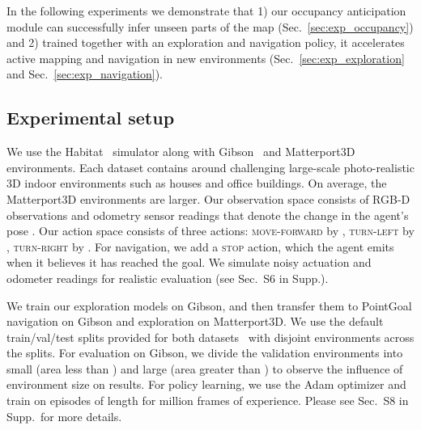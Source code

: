 \documentclass[runningheads]{llncs}
\begin{document}
In the following experiments we demonstrate that 1) our occupancy anticipation module can successfully infer unseen parts of the map (Sec.~\ref{sec:exp_occupancy}) and 2) trained together with an exploration and navigation policy, it accelerates active mapping and navigation in new environments (Sec.~\ref{sec:exp_exploration} and Sec.~\ref{sec:exp_navigation}).

\subsection{Experimental setup}
\label{sec:exp_setup}

We use the Habitat~\cite{habitat19iccv} simulator along with Gibson~\cite{xia2018gibson} and Matterport3D~\cite{chang2017matterport} environments. Each dataset contains around  challenging large-scale photo-realistic 3D indoor environments such as houses and office buildings.  On average, the Matterport3D environments are larger. Our observation space consists of  RGB-D observations and odometry sensor readings that denote the change in the agent's pose . Our action space consists of three actions: \textsc{move-forward} by , \textsc{turn-left} by , \textsc{turn-right} by . For navigation, we add a \textsc{stop} action, which the agent emits when it believes it has reached the goal. We simulate noisy actuation and odometer readings for realistic evaluation (see Sec.~S6 in Supp.).

We train our exploration models on Gibson, and then transfer them to PointGoal navigation on Gibson and exploration on Matterport3D. We use the default train/val/test splits provided for both datasets~\cite{habitat19iccv} with disjoint environments across the splits.  For evaluation on Gibson, we divide the validation environments into small (area less than ) and large (area greater than ) to observe the influence of environment size on results. For policy learning, we use the Adam optimizer and train on episodes of length  for  million frames of experience. Please see Sec.~S8 in Supp.~for more details. \\
\end{document}
